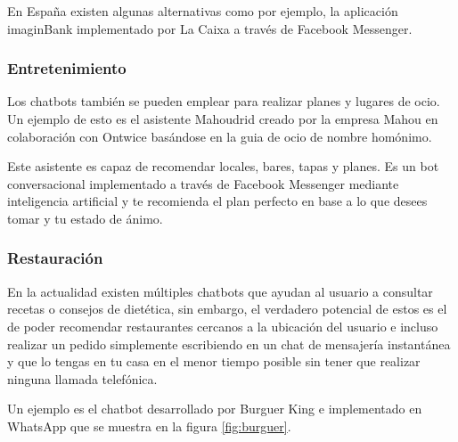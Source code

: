 En España existen algunas alternativas como por ejemplo, la aplicación imaginBank implementado por La Caixa a través de Facebook Messenger.

\subsubsection{Entretenimiento}
Los chatbots también se pueden emplear para realizar planes y lugares de ocio. Un ejemplo de esto es el asistente Mahoudrid creado por la empresa Mahou en colaboración con Ontwice basándose en la guia de ocio de nombre homónimo. 

Este asistente es capaz de recomendar locales, bares, tapas y planes. Es un bot conversacional implementado a través de Facebook Messenger mediante inteligencia artificial y te recomienda el plan perfecto en base a lo que desees tomar y tu estado de ánimo. 

\subsubsection{Restauración}
En la actualidad existen múltiples chatbots que ayudan al usuario a consultar recetas o consejos de dietética, sin embargo, el verdadero potencial de estos es el de poder recomendar restaurantes cercanos a la ubicación del usuario e incluso realizar un pedido simplemente escribiendo en un chat de mensajería instantánea y que lo tengas en tu casa en el menor tiempo posible sin tener que realizar ninguna llamada telefónica. 

Un ejemplo es el chatbot desarrollado por Burguer King \cite{burguer} e implementado en WhatsApp que se muestra en la figura \ref{fig:burguer}.


